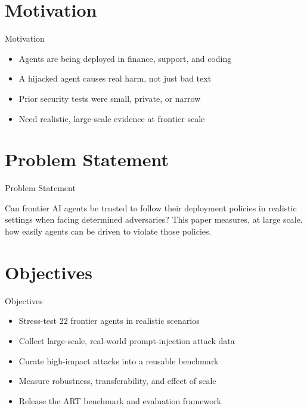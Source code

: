 \documentclass[10pt]{beamer}
\begin{document}
\section{Motivation}
\begin{frame}{Motivation}
\begin{itemize}
  \item Agents are being deployed in finance, support, and coding
  \item A hijacked agent causes real harm, not just bad text
  \item Prior security tests were small, private, or narrow
  \item Need realistic, large-scale evidence at frontier scale
\end{itemize}
\end{frame}

\section{Problem Statement}
\begin{frame}{Problem Statement}
  \begin{block}{}
  Can frontier AI agents be trusted to follow their deployment policies in realistic settings when facing determined adversaries? This paper measures, at large scale, how easily agents can be driven to violate those policies.
  \end{block}
\end{frame}

\section{Objectives}
\begin{frame}{Objectives}
\begin{itemize}
  \item Stress-test 22 frontier agents in realistic scenarios
  \item Collect large-scale, real-world prompt-injection attack data
  \item Curate high-impact attacks into a reusable benchmark
  \item Measure robustness, transferability, and effect of scale
  \item Release the ART benchmark and evaluation framework
\end{itemize}
\end{frame}
\end{document}
